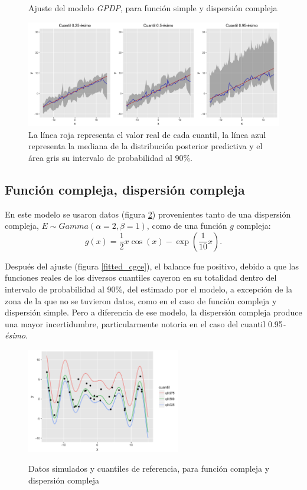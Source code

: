 \begin{figure}[H]
	\centering
	\caption{Ajuste del modelo \textit{GPDP}, para funci\'on simple y dispersi\'on compleja}
	\includegraphics[width=\textwidth]{Figures/Simulation/simple_g_complex_error/fitted_models.png}
	\captionsetup{singlelinecheck=off,font=footnotesize}
    \caption*{La l\'inea roja representa el valor real de cada cuantil, la l\'inea azul representa la mediana de la distribuci\'on posterior predictiva y el \'area gris su intervalo de probabilidad al 90\%.}
	\label{fitted_sgce}
\end{figure}

\subsection{Funci\'on compleja, dispersi\'on compleja}

En este modelo se usaron datos (figura \ref{sample_cgce}) provenientes tanto de una dispersi\'on compleja, $E \sim \textit{Gamma}(\alpha = 2,\beta = 1)$, como de una funci\'on $g$ compleja:
\begin{equation*}
    g(x) = \frac{1}{2} x \cos(x) - \exp\left(\frac{1}{10}x\right).
\end{equation*}

Despu\'es del ajuste (figura \ref{fitted_cgce}), el balance fue positivo, debido a que las funciones reales de los diversos cuantiles cayeron en su totalidad dentro del intervalo de probabilidad al 90\%, del estimado por el modelo, a excepci\'
on de la zona de la que no se tuvieron datos, como en el caso de funci\'on compleja y dispersi\'on simple. Pero a diferencia de ese modelo, la dispersi\'on compleja produce una mayor incertidumbre, particularmente notoria en el caso del cuantil 0.95\textit{-\'esimo}.

\begin{figure}[H]
	\centering
	\caption{Datos simulados y cuantiles de referencia, para funci\'on compleja y dispersi\'on compleja}
	\includegraphics[width=0.60\textwidth]{Figures/Simulation/complex_g_complex_error/sample.png}
	\label{sample_cgce}
\end{figure}

